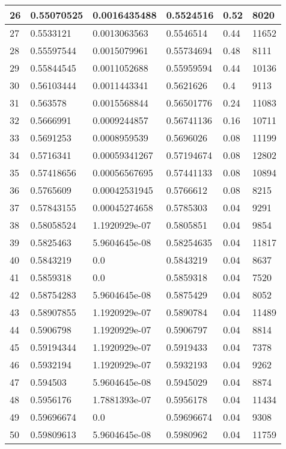 \begin{longtable}{|l|l|l|l|l|l|}
26 & 0.55070525 & 0.0016435488 & 0.5524516 & 0.52 & 8020 \\ \hline 
27 & 0.5533121 & 0.0013063563 & 0.5546514 & 0.44 & 11652 \\ \hline 
28 & 0.55597544 & 0.0015079961 & 0.55734694 & 0.48 & 8111 \\ \hline 
29 & 0.55844545 & 0.0011052688 & 0.55959594 & 0.44 & 10136 \\ \hline 
30 & 0.56103444 & 0.0011443341 & 0.5621626 & 0.4 & 9113 \\ \hline 
31 & 0.563578 & 0.0015568844 & 0.56501776 & 0.24 & 11083 \\ \hline 
32 & 0.5666991 & 0.0009244857 & 0.56741136 & 0.16 & 10711 \\ \hline 
33 & 0.5691253 & 0.0008959539 & 0.5696026 & 0.08 & 11199 \\ \hline 
34 & 0.5716341 & 0.00059341267 & 0.57194674 & 0.08 & 12802 \\ \hline 
35 & 0.57418656 & 0.00056567695 & 0.57441133 & 0.08 & 10894 \\ \hline 
36 & 0.5765609 & 0.00042531945 & 0.5766612 & 0.08 & 8215 \\ \hline 
37 & 0.57843155 & 0.00045274658 & 0.5785303 & 0.04 & 9291 \\ \hline 
38 & 0.58058524 & 1.1920929e-07 & 0.5805851 & 0.04 & 9854 \\ \hline 
39 & 0.5825463 & 5.9604645e-08 & 0.58254635 & 0.04 & 11817 \\ \hline 
40 & 0.5843219 & 0.0 & 0.5843219 & 0.04 & 8637 \\ \hline 
41 & 0.5859318 & 0.0 & 0.5859318 & 0.04 & 7520 \\ \hline 
42 & 0.58754283 & 5.9604645e-08 & 0.5875429 & 0.04 & 8052 \\ \hline 
43 & 0.58907855 & 1.1920929e-07 & 0.5890784 & 0.04 & 11489 \\ \hline 
44 & 0.5906798 & 1.1920929e-07 & 0.5906797 & 0.04 & 8814 \\ \hline 
45 & 0.59194344 & 1.1920929e-07 & 0.5919433 & 0.04 & 7378 \\ \hline 
46 & 0.5932194 & 1.1920929e-07 & 0.5932193 & 0.04 & 9262 \\ \hline 
47 & 0.594503 & 5.9604645e-08 & 0.5945029 & 0.04 & 8874 \\ \hline 
48 & 0.5956176 & 1.7881393e-07 & 0.5956178 & 0.04 & 11434 \\ \hline 
49 & 0.59696674 & 0.0 & 0.59696674 & 0.04 & 9308 \\ \hline 
50 & 0.59809613 & 5.9604645e-08 & 0.5980962 & 0.04 & 11759 \\ \hline 

\end{longtable}
